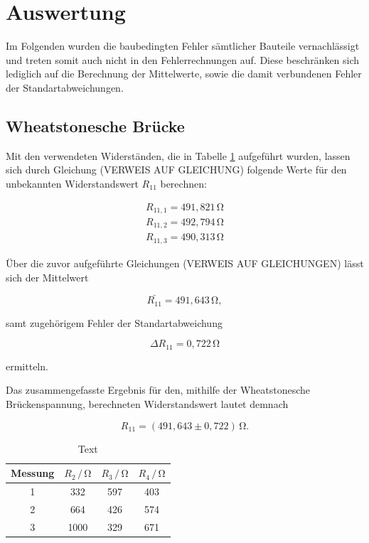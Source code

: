 \section{Auswertung}
\label{sec:Auswertung}

Im Folgenden wurden die baubedingten Fehler sämtlicher Bauteile vernachlässigt und 
treten somit auch nicht in den Fehlerrechnungen auf. Diese beschränken sich lediglich auf 
die Berechnung der Mittelwerte, sowie die damit verbundenen Fehler der Standartabweichungen.


\subsection{Wheatstonesche Brücke}

Mit den verwendeten Widerständen, die in Tabelle \ref{tab:1} aufgeführt wurden, 
lassen sich durch Gleichung (VERWEIS AUF GLEICHUNG) folgende Werte für den 
unbekannten Widerstandswert $R_{11}$ berechnen:

\begin{align}
R_{11,1} = 491,821\,\si{\ohm} \nonumber \\
R_{11,2} = 492,794\,\si{\ohm} \nonumber \\
R_{11,3} = 490,313\,\si{\ohm} \nonumber 
\end{align}

\noindent
Über die zuvor aufgeführte Gleichungen (VERWEIS AUF GLEICHUNGEN) lässt sich der  
Mittelwert 

\begin{equation}
\bar{R_{11}} = 491,643\,\si{\ohm}, \nonumber
\end{equation}

\noindent
samt zugehörigem Fehler der Standartabweichung

\begin{equation}
\Delta R_{11} = 0,722\, \si{\ohm} \nonumber
\end{equation}

\noindent 
ermitteln.

\noindent
Das zusammengefasste Ergebnis für den, mithilfe der Wheatstonesche Brückenspannung, berechneten Widerstandswert
lautet demnach

\begin{equation}
R_{11} = (491,643 \pm 0,722)\,  \si{\ohm}. \nonumber
\end{equation}
    
\begin{table}
\normalsize

\centering
{}
\begin{tabular}{c c c c}
\toprule
        Messung & $R_{2} \,/\,\si{\ohm}$ & $R_{3} \,/\,\si{\ohm}$ & $R_{4} \,/\,\si{\ohm}$ \\
        \midrule
        1 & 332 & 597 & 403  \\
        2 & 664 & 426 & 574  \\
        3 & 1000 & 329 & 671 \\ 

\bottomrule

\end{tabular}

\caption{Text}
\label{tab:1}
\end{table}

